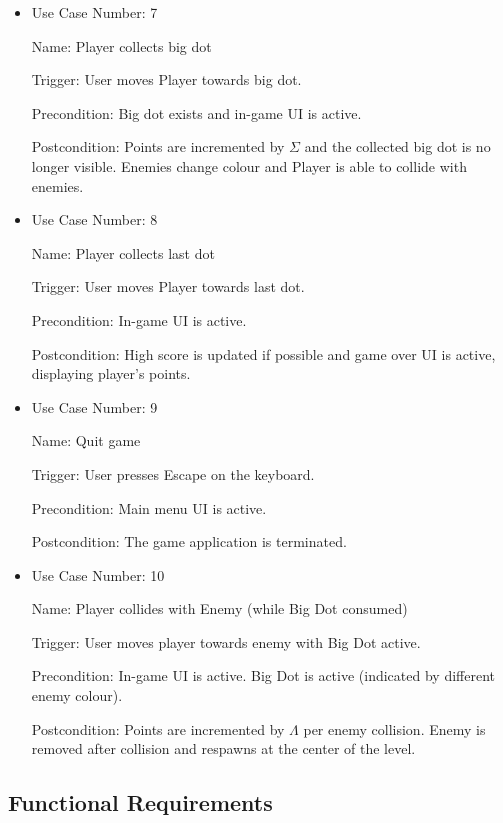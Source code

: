 \documentclass[12pt, titlepage]{article}
\begin{document}
\begin{itemize}
\item
Use Case Number: 7

Name: Player collects big dot

Trigger: User moves Player towards big dot.

Precondition: Big dot exists and in-game UI is active.

Postcondition: Points are incremented by $\hyperref[tab:constants]{\Sigma}$ and the collected big dot is no longer visible. Enemies change colour and Player is able to collide with enemies.
\end{itemize}

\begin{itemize}
\item
Use Case Number: 8

Name: Player collects last dot

Trigger: User moves Player towards last dot.

Precondition: In-game UI is active.

Postcondition: High score is updated if possible and game over UI is active, displaying player's points.
\end{itemize}

\begin{itemize}
\item
Use Case Number: 9

Name: Quit game

Trigger: User presses Escape on the keyboard.

Precondition: Main menu UI is active.

Postcondition: The game application is terminated.
\end{itemize}

\begin{itemize}
\item
Use Case Number: 10

Name: Player collides with Enemy (while Big Dot consumed)

Trigger: User moves player towards enemy with Big Dot active.

Precondition: In-game UI is active. Big Dot is active (indicated by different enemy colour).

Postcondition: Points are incremented by $\hyperref[tab:constants]{\Lambda}$ per enemy collision. Enemy is removed after collision and respawns at the center of the level.
\end{itemize}


\subsection{Functional Requirements}
\end{document}
